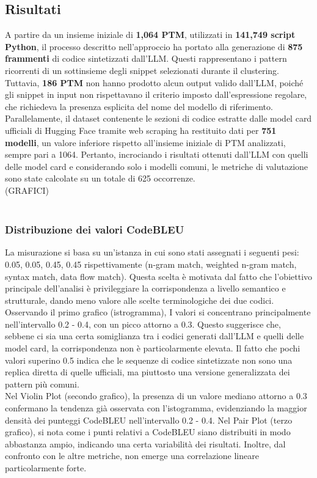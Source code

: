 \documentclass{article}
\begin{document}
\subsection{Risultati}
A partire da un insieme iniziale di \textbf{1,064 PTM}, utilizzati in \textbf{141,749 script Python}, il processo descritto nell’approccio ha portato alla generazione di \textbf{875 frammenti} di codice sintetizzati dall’LLM. Questi rappresentano i pattern ricorrenti di un sottinsieme degli snippet selezionati durante il clustering. Tuttavia, \textbf{186 PTM} non hanno prodotto alcun output valido dall’LLM, poiché gli snippet in input non rispettavano il criterio imposto dall’espressione regolare, che richiedeva la presenza esplicita del nome del modello di riferimento.\\
Parallelamente, il dataset contenente le sezioni di codice estratte dalle model card ufficiali di Hugging Face tramite web scraping ha restituito dati per \textbf{751 modelli}, un valore inferiore rispetto all'insieme iniziale di PTM analizzati, sempre pari a 1064. Pertanto, incrociando i risultati ottenuti dall’LLM con quelli delle model card e considerando solo i modelli comuni, le metriche di valutazione sono state calcolate su un totale di 625 occorrenze.\\
(GRAFICI)\\
\\

\subsubsection{Distribuzione dei valori CodeBLEU}
La misurazione si basa su un'istanza in cui sono stati assegnati i seguenti pesi: 0.05, 0.05, 0.45, 0.45 rispettivamente (n-gram match, weighted n-gram match, syntax match, data flow match). Questa scelta è motivata dal fatto che l’obiettivo principale dell’analisi è privileggiare la corrispondenza a livello semantico e strutturale, dando meno valore alle scelte terminologiche dei due codici.\\
Osservando il primo grafico (istrogramma), I valori si concentrano principalmente nell’intervallo 0.2 - 0.4, con un picco attorno a 0.3. Questo suggerisce che, sebbene ci sia una certa somiglianza tra i codici generati dall’LLM e quelli delle model card, la corrispondenza non è particolarmente elevata. Il fatto che pochi valori superino 0.5 indica che le sequenze di codice sintetizzate non sono una replica diretta di quelle ufficiali, ma piuttosto una versione generalizzata dei pattern più comuni.\\
Nel Violin Plot (secondo grafico), la presenza di un valore mediano attorno a 0.3 confermano la tendenza già osservata con l’istogramma, evidenziando la maggior densità dei punteggi CodeBLEU nell’intervallo 0.2 - 0.4. Nel Pair Plot (terzo grafico), si nota come i punti relativi a CodeBLEU siano distribuiti in modo abbastanza ampio, indicando una certa variabilità dei risultati. Inoltre, dal confronto con le altre metriche, non emerge una correlazione lineare particolarmente forte.
\end{document}
